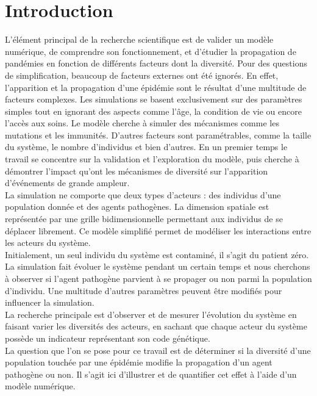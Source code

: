 \chapter{Introduction} \label{ch:introduction}

L'élément principal de la recherche scientifique est de valider un modèle numérique, de comprendre son fonctionnement, et d'étudier la propagation de pandémies en fonction de différents facteurs dont la diversité. Pour des questions de simplification, beaucoup de facteurs externes ont été ignorés. En effet, l'apparition et la propagation d'une épidémie sont le résultat d'une multitude de facteurs complexes. Les simulations se basent exclusivement sur des paramètres simples tout en ignorant des aspects comme l'âge, la condition de vie ou encore l'accès aux soins. Le modèle cherche à simuler des mécanismes comme les mutations et les immunités. D'autres facteurs sont paramétrables, comme la taille du système, le nombre d'individus et bien d'autres. En un premier temps le travail se concentre sur la validation et l'exploration du modèle, puis cherche à démontrer l'impact qu'ont les mécanismes de diversité sur l'apparition d'événements de grande ampleur.\\

La simulation ne comporte que deux types d'acteurs : des individus d'une population donnée et des agents pathogènes. La dimension spatiale est représentée par une grille bidimensionnelle permettant aux individus de se déplacer librement. Ce modèle simplifié permet de modéliser les interactions entre les acteurs du système.\\

Initialement, un seul individu du système est contaminé, il s'agit du patient zéro. La simulation fait évoluer le système pendant un certain temps et nous cherchons à observer si l'agent pathogène parvient à se propager ou non parmi la population d'individu. Une multitude d'autres paramètres peuvent être modifiés pour influencer la simulation.\\

La recherche principale est d'observer et de mesurer l'évolution du système en faisant varier les diversités des acteurs, en sachant que chaque acteur du système possède un indicateur représentant son code génétique.\\

La question que l'on se pose pour ce travail est de déterminer si la diversité d'une population touchée par une épidémie modifie la propagation d'un agent pathogène ou non. Il s'agit ici d'illustrer et de quantifier cet effet à l'aide d'un modèle numérique.